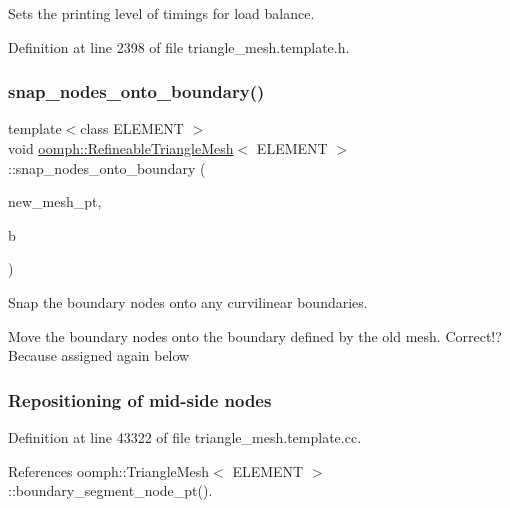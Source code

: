 Sets the printing level of timings for load balance. 



Definition at line 2398 of file triangle\+\_\+mesh.\+template.\+h.

\mbox{\label{classoomph_1_1RefineableTriangleMesh_a3c302af1c17063eb32f56abe9f000360}} 
\subsubsection{\texorpdfstring{snap\+\_\+nodes\+\_\+onto\+\_\+boundary()}{snap\_nodes\_onto\_boundary()}}
{\footnotesize\ttfamily template$<$class E\+L\+E\+M\+E\+NT $>$ \\
void \hyperlink{classoomph_1_1RefineableTriangleMesh}{oomph\+::\+Refineable\+Triangle\+Mesh}$<$ E\+L\+E\+M\+E\+NT $>$\+::snap\+\_\+nodes\+\_\+onto\+\_\+boundary (\begin{DoxyParamCaption}\item[{\hyperlink{classoomph_1_1RefineableTriangleMesh}{Refineable\+Triangle\+Mesh}$<$ E\+L\+E\+M\+E\+NT $>$ $\ast$\&}]{new\+\_\+mesh\+\_\+pt,  }\item[{const unsigned \&}]{b }\end{DoxyParamCaption})\hspace{0.3cm}{\ttfamily [protected]}}



Snap the boundary nodes onto any curvilinear boundaries. 

Move the boundary nodes onto the boundary defined by the old mesh. Correct!? Because assigned again below 

 \subsubsection*{Repositioning of mid-\/side nodes }

Definition at line 43322 of file triangle\+\_\+mesh.\+template.\+cc.



References oomph\+::\+Triangle\+Mesh$<$ E\+L\+E\+M\+E\+N\+T $>$\+::boundary\+\_\+segment\+\_\+node\+\_\+pt().


